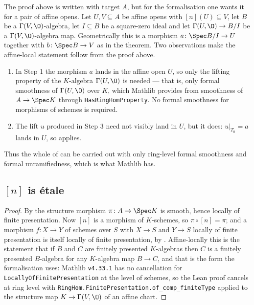 \begin{remark}\label{rem:av-smooth-affine-local}
The proof above is written with target $A$, but for the formalisation one wants
it for a pair of affine opens.  Let $U,V\subseteq A$ be affine opens with
$[n](U)\subseteq V$, let $B$ be a $\Gamma(V,\O)$-algebra, let $I\subseteq B$ be
a square-zero ideal and let $\Gamma(U,\O)\to B/I$ be a
$\Gamma(V,\O)$-algebra map.  Geometrically this is a morphism
$a\colon\Spec B/I\to U$ together with $b\colon\Spec B\to V$ as in the theorem.
Two observations make the affine-local statement follow from the proof above.
\begin{enumerate}
  \item In Step 1 the morphism $a$ lands in the affine open $U$, so only the
    lifting property of the $K$-algebra $\Gamma(U,\O)$ is needed --- that is,
    only formal smoothness of $\Gamma(U,\O)$ over $K$, which Mathlib provides
    from smoothness of $A\to\Spec K$ through \texttt{HasRingHomProperty}.  No
    formal smoothness for morphisms of schemes is required.
  \item The lift $u$ produced in Step 3 need not visibly land in $U$, but it
    does: $u|_{T_0}=a$ lands in $U$, so 
    applies.
\end{enumerate}
Thus the whole of  can be
carried out with only ring-level formal smoothness and formal unramifiedness,
which is what Mathlib has.
\end{remark}

\subsection{$[n]$ is \'etale}\label{sec:av-etale-conclusion}

\begin{proof}
\leanok
By  the structure morphism $\pi\colon A\to\Spec K$ is
smooth, hence locally of finite presentation.  Now $[n]$ is a morphism of
$K$-schemes, so $\pi\circ[n]=\pi$; and a morphism $f\colon X\to Y$ of schemes
over $S$ with $X\to S$ and $Y\to S$ locally of finite presentation is itself
locally of finite presentation, by .  Affine-locally this
is the statement that if $B$ and $C$ are finitely presented $K$-algebras then
$C$ is a finitely presented $B$-algebra for any $K$-algebra map $B\to C$, and
that is the form the formalisation uses: Mathlib \texttt{v4.33.1} has no
cancellation for \texttt{LocallyOfFinitePresentation} at the level of schemes,
so the Lean proof cancels at ring level with
\texttt{RingHom.FinitePresentation.of\_comp\_finiteType} applied to the
structure map $K\to\Gamma(V,\O)$ of an affine chart.
\end{proof}


